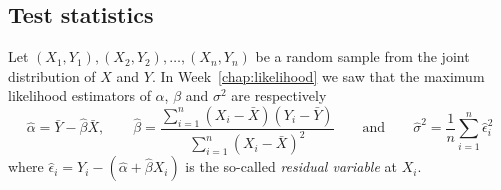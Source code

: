 \subsection{Test statistics}

Let $(X_1,Y_1),(X_2,Y_2),\ldots,(X_n,Y_n)$ be a random sample from the joint distribution of $X$ and $Y$. 
In Week~\ref{chap:likelihood} we saw that the maximum likelihood estimators of $\alpha$, $\beta$ and $\sigma^2$ are respectively
\[
\hat{\alpha} = \bar{Y}-\hat{\beta}\bar{X},\qquad
\hat{\beta} = \frac{\sum_{i=1}^n (X_i-\bar{X})(Y_i-\bar{Y})}{\sum_{i=1}^n (X_i-\bar{X})^2}
\qquad\text{and}\qquad
\hat{\sigma}^2 = \frac{1}{n}\sum_{i=1}^n \hat{\epsilon}_i^2 
\]
where $\hat{\epsilon}_i = Y_i-(\hat{\alpha}+\hat{\beta} X_i)$ is the so-called \emph{residual variable} at $X_i$.


%
%

